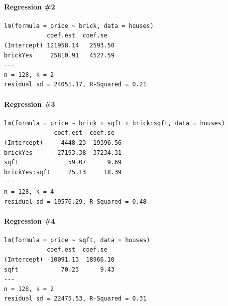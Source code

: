 \documentclass[addpoints,12pt]{exam}
\begin{document}
\begin{questions}
\paragraph{Regression \#2}
\begin{verbatim}
lm(formula = price ~ brick, data = houses)
            coef.est  coef.se  
(Intercept) 121958.14   2593.50
brickYes     25810.91   4527.59
---
n = 128, k = 2
residual sd = 24051.17, R-Squared = 0.21
\end{verbatim}

\paragraph{Regression \#3}
\begin{verbatim}
lm(formula = price ~ brick + sqft + brick:sqft, data = houses)
              coef.est  coef.se  
(Intercept)     4448.23  19396.56
brickYes      -27193.38  37234.31
sqft              59.07      9.69
brickYes:sqft     25.13     18.39
---
n = 128, k = 4
residual sd = 19576.29, R-Squared = 0.48
\end{verbatim}

\paragraph{Regression \#4}
\begin{verbatim}
lm(formula = price ~ sqft, data = houses)
            coef.est  coef.se  
(Intercept) -10091.13  18966.10
sqft            70.23      9.43
---
n = 128, k = 2
residual sd = 22475.53, R-Squared = 0.31
\end{verbatim}


\end{questions}
\end{document}
